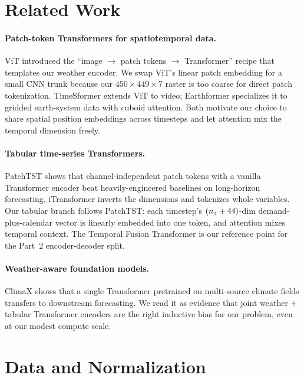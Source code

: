 \documentclass[11pt,letterpaper]{article}
\begin{document}
\section{Related Work}
\label{sec:relwork}

\paragraph{Patch-token Transformers for spatiotemporal data.} ViT \citep{dosovitskiy2021vit} introduced the ``image $\to$ patch tokens $\to$ Transformer'' recipe that templates our weather encoder. We swap ViT's linear patch embedding for a small CNN trunk because our $450{\times}449{\times}7$ raster is too coarse for direct patch tokenization. TimeSformer \citep{bertasius2021timesformer} extends ViT to video; Earthformer \citep{gao2022earthformer} specializes it to gridded earth-system data with cuboid attention. Both motivate our choice to share spatial position embeddings across timesteps and let attention mix the temporal dimension freely.

\paragraph{Tabular time-series Transformers.} PatchTST \citep{nie2023patchtst} shows that channel-independent patch tokens with a vanilla Transformer encoder beat heavily-engineered baselines on long-horizon forecasting. iTransformer \citep{liu2024itransformer} inverts the dimensions and tokenizes whole variables. Our tabular branch follows PatchTST: each timestep's $(n_{z} + 44)$-dim demand-plus-calendar vector is linearly embedded into one token, and attention mixes temporal context. The Temporal Fusion Transformer \citep{lim2021tft} is our reference point for the Part~2 encoder-decoder split.

\paragraph{Weather-aware foundation models.} ClimaX \citep{nguyen2023climax} shows that a single Transformer pretrained on multi-source climate fields transfers to downstream forecasting. We read it as evidence that joint weather + tabular Transformer encoders are the right inductive bias for our problem, even at our modest compute scale.

\section{Data and Normalization}
\label{sec:data}
\end{document}
